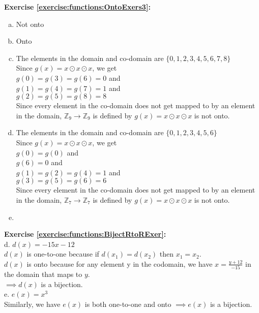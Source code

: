 \noindent\textbf{Exercise \ref{exercise:functions:OntoExers3}:} %
\begin{enumerate}[(a)]
\item
Not onto
\item \label{modular_m3}
Onto
\item 
The elements in the domain and co-domain are $\{0,1,2,3,4,5,6,7,8\}$\\
Since $g(x)=x\odot x\odot x$, we get\\
$g(0)=g(3)=g(6)=0$ and\\ 
$g(1)=g(4)=g(7)=1$ and\\ 
$g(2)=g(5)=g(8)=8$\\        
Since every element in the co-domain does not get mapped to by an element in the domain, $\mathbb{Z}_{9}\to \mathbb{Z}_{9}$ is defined by $g(x)=x\odot x\odot x$ is not onto.

\item 
The elements in the domain and co-domain are $\{0,1,2,3,4,5,6\}$\\
Since $g(x)=x\odot x\odot x$, we get\\
$g(0)=g(0)$ and\\ 
$g(6)=0$ and\\ 
$g(1)=g(2)=g(4)=1$ and\\ 
$g(3)=g(5)=g(6)=6$\\
Since every element in the co-domain does not get mapped to by an element in the domain, $\mathbb{Z}_{7}\to \mathbb{Z}_{7}$ is defined by $g(x)=x\odot x\odot x$ is not onto.

\item 

\end{enumerate}



\noindent\textbf{Exercise \ref{exercise:functions:BijectRtoRExer}:}\\
d. $d(x)=-15x-12$\\
$d(x)$ is one-to-one because if $d(x_1)=d(x_2)$ then $x_1=x_2$.\\
$d(x)$ is onto because for any element y in the codomain, we have $x=\displaystyle\frac{y+12}{-15}$ in the domain that maps to $y$.\\
$\implies d(x)$ is a bijection.\\
e. $e(x)=x^3$\\
Similarly, we have $e(x)$ is both one-to-one and onto $\implies e(x)$ is a bijection.\\

